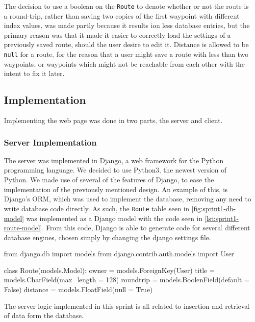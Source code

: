 The decision to use a boolean on the \texttt{Route} to denote whether or not the route is a round-trip, rather than saving two copies of the first waypoint with different index values, was made partly because it results ion less database entries, but the primary reason was that it made it easier to correctly load the settings of a previously saved route, should the user desire to edit it. Distance is allowed to be \texttt{null} for a route, for the reason that a user might save a route with less than two waypoints, or waypoints which might not be reachable from each other with the intent to fix it later.

\subsection{Implementation}

Implementing the web page was done in two parts, the server and client.

\subsubsection{Server Implementation}

The server was implemented in Django\cite{djangoproject}, a web framework for the Python programming language. We decided to use Python3, the newest version of Python. We made use of several of the features of Django, to ease the implementation of the previously mentioned design. An example of this, is Django's \ac{ORM}, which was used to implement the database, removing any need to write database code directly. As such, the \texttt{Route} table seen in \autoref{fig:sprint1-db-model} was implemented as a Django model with the code seen in \autoref{lst:sprint1-route-model}. From this code, Django is able to generate code for several different database engines, chosen simply by changing the django settings file.

\begin{code}[language={Python}, label={lst:sprint1-route-model}, caption={Sprint 1 "Route" Model}]
from django.db import models
from django.contrib.auth.models import User

class Route(models.Model):
	owner = models.ForeignKey(User)
	title = models.CharField(max_length = 128)
	roundtrip = models.BoolenField(default = False)
	distance = models.FloatField(null = True)
\end{code}

The server logic implemented in this sprint is all related to insertion and retrieval of data form the database.

